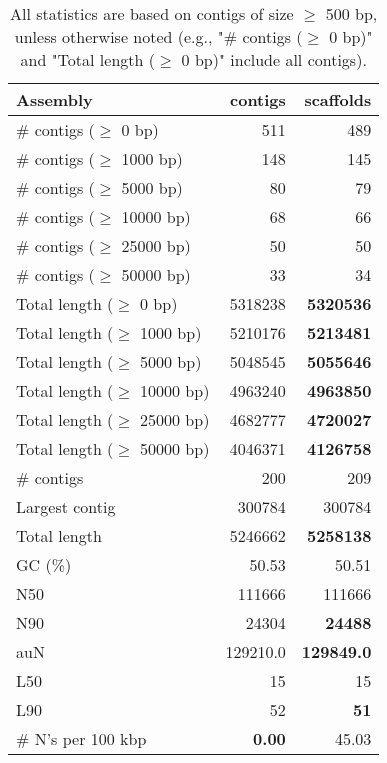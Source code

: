 \documentclass[12pt,a4paper]{article}
\begin{document}
\begin{table}[ht]
\begin{center}
\caption{All statistics are based on contigs of size $\geq$ 500 bp, unless otherwise noted (e.g., "\# contigs ($\geq$ 0 bp)" and "Total length ($\geq$ 0 bp)" include all contigs).}
\begin{tabular}{|l*{2}{|r}|}
\hline
Assembly & contigs & scaffolds \\ \hline
\# contigs ($\geq$ 0 bp) & 511 & 489 \\ \hline
\# contigs ($\geq$ 1000 bp) & 148 & 145 \\ \hline
\# contigs ($\geq$ 5000 bp) & 80 & 79 \\ \hline
\# contigs ($\geq$ 10000 bp) & 68 & 66 \\ \hline
\# contigs ($\geq$ 25000 bp) & 50 & 50 \\ \hline
\# contigs ($\geq$ 50000 bp) & 33 & 34 \\ \hline
Total length ($\geq$ 0 bp) & 5318238 & {\bf 5320536} \\ \hline
Total length ($\geq$ 1000 bp) & 5210176 & {\bf 5213481} \\ \hline
Total length ($\geq$ 5000 bp) & 5048545 & {\bf 5055646} \\ \hline
Total length ($\geq$ 10000 bp) & 4963240 & {\bf 4963850} \\ \hline
Total length ($\geq$ 25000 bp) & 4682777 & {\bf 4720027} \\ \hline
Total length ($\geq$ 50000 bp) & 4046371 & {\bf 4126758} \\ \hline
\# contigs & 200 & 209 \\ \hline
Largest contig & 300784 & 300784 \\ \hline
Total length & 5246662 & {\bf 5258138} \\ \hline
GC (\%) & 50.53 & 50.51 \\ \hline
N50 & 111666 & 111666 \\ \hline
N90 & 24304 & {\bf 24488} \\ \hline
auN & 129210.0 & {\bf 129849.0} \\ \hline
L50 & 15 & 15 \\ \hline
L90 & 52 & {\bf 51} \\ \hline
\# N's per 100 kbp & {\bf 0.00} & 45.03 \\ \hline
\end{tabular}
\end{center}
\end{table}
\end{document}

